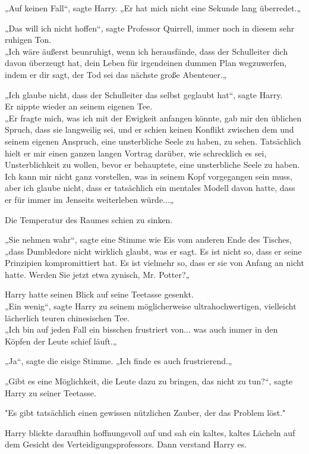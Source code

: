 {„Auf keinen Fall“, sagte Harry. „Er hat mich nicht eine Sekunde lang überredet.„

„Das will ich nicht hoffen“, sagte Professor Quirrell, immer noch in diesem sehr ruhigen Ton.\\ „Ich wäre äußerst beunruhigt, wenn ich herausfände, dass der Schulleiter dich davon überzeugt hat, dein Leben für irgendeinen dummen Plan wegzuwerfen, indem er dir sagt, der Tod sei das nächste große Abenteuer.„

„Ich glaube nicht, dass der Schulleiter das selbst geglaubt hat“, sagte Harry.\\ Er nippte wieder an seinem eigenen Tee.\\ „Er fragte mich, was ich mit der Ewigkeit anfangen könnte, gab mir den üblichen Spruch, dass sie langweilig sei, und er schien keinen Konflikt zwischen dem und seinem eigenen Anspruch, eine unsterbliche Seele zu haben, zu sehen. Tatsächlich hielt er mir einen ganzen langen Vortrag darüber, wie schrecklich es sei, Unsterblichkeit zu wollen, bevor er behauptete, eine unsterbliche Seele zu haben. Ich kann mir nicht ganz vorstellen, was in seinem Kopf vorgegangen sein muss, aber ich glaube nicht, dass er tatsächlich ein mentales Modell davon hatte, dass er für immer im Jenseits weiterleben würde...„

Die Temperatur des Raumes schien zu sinken.

„Sie nehmen wahr“, sagte eine Stimme wie Eis vom anderen Ende des Tisches, „dass Dumbledore nicht wirklich glaubt, was er sagt. Es ist nicht so, dass er seine Prinzipien kompromittiert hat. Es ist vielmehr so, dass er sie von Anfang an nicht hatte. Werden Sie jetzt etwa zynisch, Mr. Potter?„

Harry hatte seinen Blick auf seine Teetasse gesenkt.\\ „Ein wenig“, sagte Harry zu seinem möglicherweise ultrahochwertigen, vielleicht lächerlich teuren chinesischen Tee.\\ „Ich bin auf jeden Fall ein bisschen frustriert von... was auch immer in den Köpfen der Leute schief läuft.„

„Ja“, sagte die eisige Stimme. „Ich finde es auch frustrierend.„

„Gibt es eine Möglichkeit, die Leute dazu zu bringen, das nicht zu tun?“, sagte Harry zu seiner Teetasse.

"Es gibt tatsächlich einen gewissen nützlichen Zauber, der das Problem löst."

Harry blickte daraufhin hoffnungsvoll auf und sah ein kaltes, kaltes Lächeln auf dem Gesicht des Verteidigungsprofessors. Dann verstand Harry es.

}
